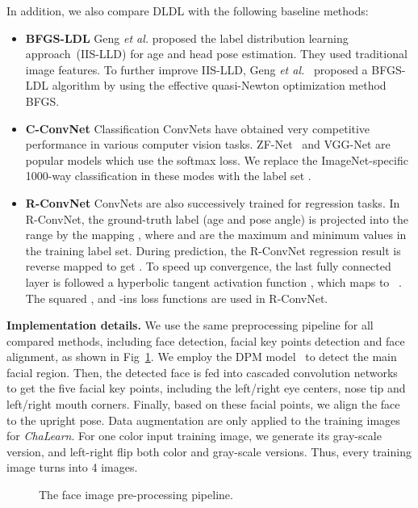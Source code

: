 \documentclass[journal]{IEEEtran}
\begin{document}
In addition, we also compare DLDL with the following baseline methods:
\begin{itemize}
\item \textbf{BFGS-LDL} Geng \emph{et al.} proposed the label distribution learning approach~(IIS-LLD) for age and head pose estimation. They used traditional image features. To further improve IIS-LLD, Geng \emph{et al.}~\cite{geng2016label} proposed a BFGS-LDL algorithm by using the effective quasi-Newton optimization method BFGS.
\item \textbf{C-ConvNet} Classification ConvNets have obtained very competitive performance in various computer vision tasks. ZF-Net~\cite{zeiler2014visualizing} and VGG-Net are popular models which use the softmax loss. We replace the ImageNet-specific 1000-way classification in these modes with the label set .
\item \textbf{R-ConvNet} ConvNets are also successively trained for regression tasks. In R-ConvNet, the ground-truth label  (age and pose angle) is projected into the range  by the mapping , where  and  are the maximum and minimum values in the training label set. During prediction, the R-ConvNet regression result is reverse mapped to get . To speed up convergence, the last fully connected layer is followed a hyperbolic tangent activation function , which maps  to ~\cite{ahn2015real}. The squared ,  and -ins loss functions are used in R-ConvNet.
\end{itemize}

\textbf{Implementation details.} We use the same preprocessing pipeline for all compared methods, including face detection, facial key points detection and face alignment, as shown in Fig~\ref{fig:age-pre}. We employ the DPM model~\cite{mathias2014face} to detect the main facial region. Then, the detected face is fed into cascaded convolution networks~\cite{sun2013deep} to get the five facial key points, including the left/right eye centers, nose tip and left/right mouth corners. Finally, based on these facial points, we align the face to the upright pose. Data augmentation are only applied to the training images for \emph{ChaLearn}. For one color input training image, we generate its gray-scale version, and left-right flip both color and gray-scale versions. Thus, every training image turns into 4 images.

\begin{figure}
	\centering
	\caption{ The face image pre-processing pipeline.} \label{fig:age-pre}
\end{figure}
\end{document}
